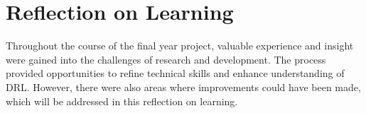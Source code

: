 







\newpage
\section{Reflection on Learning} \label{sec:reflection}

Throughout the course of the final year project, valuable experience and insight were gained into the challenges of research and development. The process provided opportunities to refine technical skills and enhance understanding of DRL. However, there were also areas where improvements could have been made, which will be addressed in this reflection on learning.

